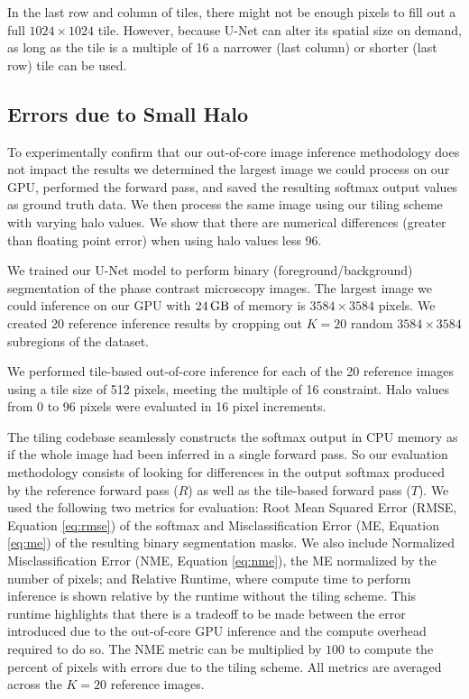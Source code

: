 \documentclass[runningheads]{llncs}
\begin{document}
In the last row and column of tiles, there might not be enough pixels to fill out a full $1024 \times 1024$ tile. However, because U-Net can alter its spatial size on demand, as long as the tile is a multiple of 16 a narrower (last column) or shorter (last row) tile can be used. 


\subsection{Errors due to Small Halo}

To experimentally confirm that our out-of-core image inference methodology does not impact the results we determined the largest image we could process on our GPU, performed the forward pass, and saved the resulting softmax output values as ground truth data. We then process the same image using our tiling scheme with varying halo values. We show that there are numerical differences (greater than floating point error) when using halo values less 96. 

We trained our U-Net model to perform binary (foreground/background) segmentation of the phase contrast microscopy images. The largest image we could inference on our GPU with $\SI{24}{\giga\byte}$ of memory is $3584 \times 3584$ pixels. We created 20 reference inference results by cropping out $K = 20$ random $3584 \times 3584$ subregions of the dataset. 

We performed tile-based out-of-core inference for each of the 20 reference images using a tile size of 512 pixels, meeting the multiple of 16 constraint. Halo values from 0 to 96 pixels were evaluated in 16 pixel increments. 

The tiling codebase seamlessly constructs the softmax output in CPU memory as if the whole image had been inferred in a single forward pass. So our evaluation methodology consists of looking for differences in the output softmax produced by the reference forward pass ($R$) as well as the tile-based forward pass ($T$). We used the following two metrics for evaluation: Root Mean Squared Error (RMSE, Equation \ref{eq:rmse}) of the softmax and Misclassification Error (ME, Equation \ref{eq:me}) of the resulting binary segmentation masks. %
We also include Normalized Misclassification Error (NME, Equation \ref{eq:nme}), the ME normalized by the number of pixels; and Relative Runtime, where compute time to perform inference is shown relative by the runtime without the tiling scheme. This runtime highlights that there is a tradeoff to be made between the error introduced due to the out-of-core GPU inference and the compute overhead required to do so. The NME metric can be multiplied by $100$ to compute the percent of pixels with errors due to the tiling scheme.
All metrics are averaged across the $K = 20$ reference images.
\end{document}
